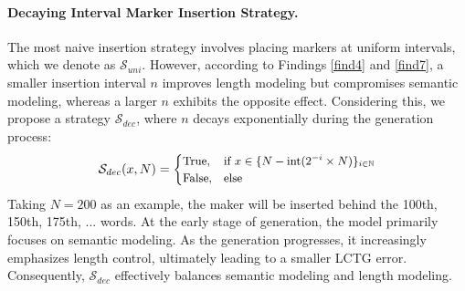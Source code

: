 \paragraph{Decaying Interval Marker Insertion Strategy.}
The most naive insertion strategy involves placing markers at uniform intervals, which we denote as $\mathcal{S}_{uni}$.
However, according to Findings \ref{find4} and \ref{find7}, a smaller insertion interval $n$ improves length modeling but compromises semantic modeling, whereas a larger $n$ exhibits the opposite effect.
Considering this, we propose a strategy $\mathcal{S}_{dec}$, where $n$ decays exponentially during the generation process:
\begin{equation}
    \small
    \mathcal{S}_{dec}(x,N)= \begin{cases}
        \text{True}, & \text{if} \ x \in\{N-\text{int}(2^{-i}\times N)\}_{i\in \mathbb{N}}   \\
        \text{False},& \text{else}
    \end{cases}
\end{equation}
Taking $N=200$ as an example, the maker will be inserted behind the 100th, 150th, 175th, ... words.
At the early stage of generation, the model primarily focuses on semantic modeling. As the generation progresses, it increasingly emphasizes length control, ultimately leading to a smaller LCTG error. 
Consequently, $\mathcal{S}_{dec}$ effectively balances semantic modeling and length modeling.




